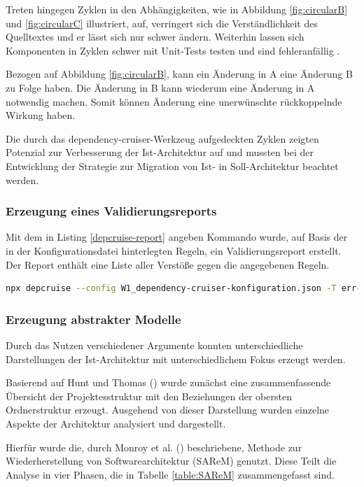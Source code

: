 Treten hingegen Zyklen in den Abhängigkeiten, wie in Abbildung \ref{fig:circularB} und \ref{fig:circularC} illustriert, auf, verringert sich die Verständlichkeit des Quelltextes und er lässt sich nur schwer ändern. Weiterhin lassen sich Komponenten in Zyklen schwer mit Unit-Tests testen und sind fehleranfällig \autocite[vgl.][116-117]{Martin2018}.

Bezogen auf Abbildung \ref{fig:circularB}, kann ein Änderung in A eine Änderung B zu Folge haben. Die Änderung in B kann wiederum eine Änderung in A notwendig machen. Somit können Änderung eine unerwünschte rückkoppelnde Wirkung haben.

Die durch das dependency-cruiser-Werkzeug aufgedeckten Zyklen zeigten Potenzial zur Verbesserung der Ist-Architektur auf und mussten bei der Entwicklung der Strategie zur Migration von Ist- in Soll-Architektur beachtet werden.

\subsubsection{Erzeugung eines Validierungsreports}
Mit dem in Listing \ref{depcruise-report} angeben Kommando wurde, auf Basis der in der Konfigurationsdatei hinterlegten Regeln, ein Validierungsreport erstellt.
Der Report enthält eine Liste aller Verstöße gegen die angegebenen Regeln.
\begin{lstlisting}[language={sh}, label=depcruise-report, caption=Kommando zur Erzeugung eines Validierungsreports]
npx depcruise --config W1_dependency-cruiser-konfiguration.json -T err-html src -f Validierungsreport.html
\end{lstlisting}

\subsubsection{Erzeugung abstrakter Modelle}
Durch das Nutzen verschiedener Argumente konnten unterschiedliche Darstellungen der Ist-Architektur mit unterschiedlichem Fokus erzeugt werden. 

Basierend auf Hunt und Thomas (\citeyear[vgl.][23]{Hunt2002}) wurde zunächst eine zusammenfassende Übersicht der Projektesstruktur mit den Beziehungen der obersten Ordnerstruktur erzeugt. 
Ausgehend von dieser Darstellung wurden einzelne Aspekte der Architektur analysiert und dargestellt.

Hierfür wurde die, durch Monroy et al. (\citeyear[vgl.][]{Monroy2018}) beschriebene, Methode zur Wiederherstellung von Softwarearchitektur (SAReM) genutzt. Diese Teilt die Analyse in vier Phasen, die in Tabelle \ref{table:SAReM} zusammengefasst sind.
        
